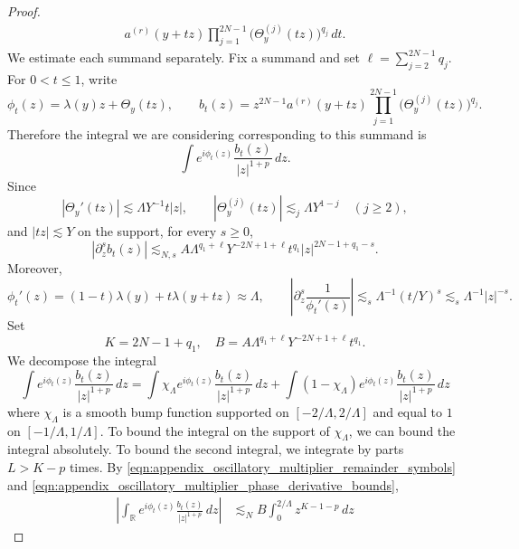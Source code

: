 \documentclass[11pt]{amsart}
\theoremstyle{definition}
\theoremstyle{remark}
\numberwithin{equation}{section}
\begin{document}
\begin{proof}
\begin{equation}
\begin{aligned}
            a^{(r)}(y+tz)\prod_{j=1}^{2N-1}
            \bigl(\Theta_y^{(j)}(tz)\bigr)^{q_j}\,dt.
        \end{aligned}
    \end{equation}
    We estimate each summand separately. Fix a summand and set $\ell=\sum_{j=2}^{2N-1}q_j$. For $0<t\leq1$, write
    \[
        \phi_t(z)=\lambda(y)z+\Theta_y(tz),\qquad
        b_t(z)=z^{2N-1}a^{(r)}(y+tz)
        \prod_{j=1}^{2N-1}\bigl(\Theta_y^{(j)}(tz)\bigr)^{q_j}.
    \]
    Therefore the integral we are considering corresponding to this summand is 
    \[\int e^{i\phi_t(z)}\frac{b_t(z)}{|z|^{1+p}} \, dz.\]
    Since
    \[
        |\Theta_y'(tz)|\lesssim\Lambda Y^{-1}t|z|,\qquad
        |\Theta_y^{(j)}(tz)|\lesssim_j\Lambda Y^{1-j}\quad(j\geq2),
    \]
    and $|tz|\lesssim Y$ on the support, for every $s\geq0$,
    \begin{equation}\label{eqn:appendix_oscillatory_multiplier_remainder_symbols}
        |\partial_z^s b_t(z)|
        \lesssim_{N,s}A\Lambda^{q_1+\ell}Y^{-2N+1+\ell}
        t^{q_1}|z|^{2N-1+q_1-s}.
    \end{equation}
    Moreover,
    \begin{equation}\label{eqn:appendix_oscillatory_multiplier_phase_derivative_bounds}
        \phi_t'(z)=(1-t)\lambda(y)+t\lambda(y+tz)\approx\Lambda,
        \qquad
        \left|\partial_z^s\frac1{\phi_t'(z)}\right|
        \lesssim_s\Lambda^{-1}(t/Y)^s
        \lesssim_s\Lambda^{-1}|z|^{-s}.
    \end{equation}
    Set 
    \[K=2N-1+q_1, \quad B=A\Lambda^{q_1+\ell}Y^{-2N+1+\ell}t^{q_1}.\]
    We decompose the integral
    \[\int e^{i\phi_t(z)}\frac{b_t(z)}{|z|^{1+p}} \, dz = \int \chi_\Lambda e^{i\phi_t(z)}\frac{b_t(z)}{|z|^{1+p}} \, dz + \int (1 - \chi_\Lambda) e^{i\phi_t(z)}\frac{b_t(z)}{|z|^{1+p}} \, dz\]
    where $\chi_\Lambda$ is a smooth bump function supported on $[-2/\Lambda, 2/\Lambda]$ and equal to $1$ on $[-1/\Lambda, 1/\Lambda]$. To bound the integral on the support of $\chi_\Lambda$,  we can bound the integral absolutely. To bound the second integral, we integrate by parts $L>K-p$ times. By \eqref{eqn:appendix_oscillatory_multiplier_remainder_symbols} and \eqref{eqn:appendix_oscillatory_multiplier_phase_derivative_bounds},
    \begin{equation}\label{eqn:appendix_oscillatory_multiplier_remainder_summand}
        \begin{aligned}
            \left|\int_{\mathbb R}e^{i\phi_t(z)}\frac{b_t(z)}{|z|^{1+p}}\,dz\right|
            &\lesssim_N B\int_0^{2/\Lambda}z^{K-1-p}\,dz

\end{aligned}
\end{equation}
\end{proof}
\end{document}

